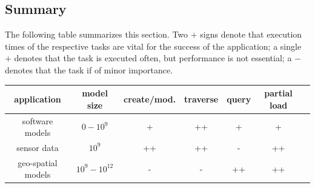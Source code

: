 \subsection*{Summary}

The following table summarizes this section. Two $+$ signs denote that execution times of the respective tasks are vital for the success of the application; a single $+$ denotes that the task is executed often, but performance is not essential; a $-$ denotes that the task if of minor importance.

\begin{center}
\begin{tabular}{|c||c|c|c|c|c|c|}
\hline
\bf{application} & \bf{model size} & \bf{create/mod.} & \bf{traverse} & \bf{query} & \bf{partial load} \\
\hline\hline
software models & $0-10^9$ & + & ++ & + & + \\
\hline
sensor data & $10^9$ & ++ & ++ & - & ++ \\
\hline
geo-spatial models & $10^9-10^{12}$ & - & - & ++ & ++ \\
\hline
\end{tabular}
\end{center}